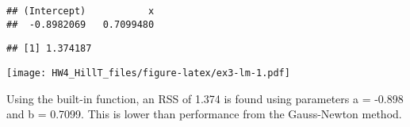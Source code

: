 \documentclass[
]{article}
\newenvironment{Shaded}{\begin{snugshade}}{\end{snugshade}}
\newcommand{\DecValTok}[1]{\textcolor[rgb]{0.00,0.00,0.81}{#1}}
\newcommand{\KeywordTok}[1]{\textcolor[rgb]{0.13,0.29,0.53}{\textbf{#1}}}
\newcommand{\NormalTok}[1]{#1}
\newcommand{\OperatorTok}[1]{\textcolor[rgb]{0.81,0.36,0.00}{\textbf{#1}}}
\newcommand{\StringTok}[1]{\textcolor[rgb]{0.31,0.60,0.02}{#1}}
\begin{document}
\begin{verbatim}
## (Intercept)           x 
##  -0.8982069   0.7099480
\end{verbatim}

\begin{Shaded}
\end{Shaded}

\begin{verbatim}
## [1] 1.374187
\end{verbatim}

\begin{Shaded}
\end{Shaded}

\texttt{[image: HW4\_HillT\_files/figure-latex/ex3-lm-1.pdf]}

Using the built-in function, an RSS of 1.374 is found using parameters a
= -0.898 and b = 0.7099. This is lower than performance from the
Gauss-Newton method.
\end{document}

